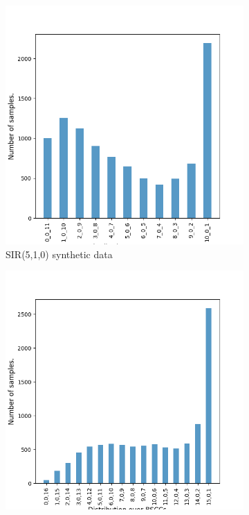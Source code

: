 \begin{figure}[H]
\begin{subfigure}{0.3\textwidth}
        \includegraphics[width=\linewidth]{figures/sir1010_data.png}
        \caption{SIR(5,1,0) synthetic data}
    \end{subfigure}
    \hfill
    \begin{subfigure}{0.3\textwidth}
        \centering
        \includegraphics[width=\linewidth]{figures/sir1510_data.png}

\end{subfigure}
\end{figure}

